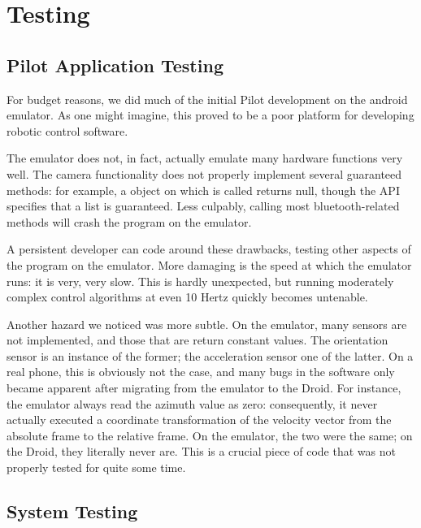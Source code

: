 \section{Testing}
\subsection{Pilot Application Testing}
For budget reasons, we did much of the initial Pilot development on
the android emulator.  As one might imagine, this proved to be a poor
platform for developing robotic control software.

The emulator does not, in fact, actually emulate many hardware
functions very well.  The camera functionality does not properly
implement several guaranteed methods: for example, a
 object on which
 is called returns null, though the
API specifies that a list is guaranteed.  Less culpably, calling most
bluetooth-related methods will crash the program on the emulator.

A persistent developer can code around these drawbacks, testing other
aspects of the program on the emulator.  More damaging is the speed at
which the emulator runs: it is very, very slow.  This is hardly
unexpected, but running moderately complex control algorithms at even 10
Hertz quickly becomes untenable.

Another hazard we noticed was more subtle.  On the emulator, many
sensors are not implemented, and those that are return constant
values.  The orientation sensor is an instance of the former; the
acceleration sensor one of the latter.  On a real phone, this is
obviously not the case, and many bugs in the software only became
apparent after migrating from the emulator to the Droid.  For
instance, the emulator always read the azimuth value as zero:
consequently, it never actually executed a coordinate transformation
of the velocity vector from the absolute frame to the relative frame.
On the emulator, the two were the same; on the Droid, they literally
never are.  This is a crucial piece of code that was not properly
tested for quite some time.

\subsection{System Testing}
